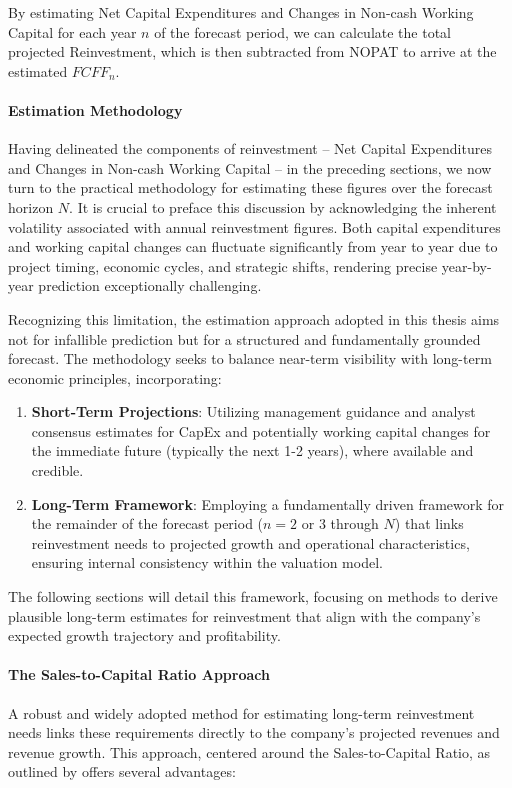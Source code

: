 By estimating Net Capital Expenditures and Changes in Non-cash Working Capital for each year \(n\) of the forecast period, we can calculate the total projected Reinvestment, which is then subtracted from NOPAT to arrive at the estimated \(FCFF_n\).

\paragraph{Estimation Methodology} \label{par:reinvestment_estimation_method}
Having delineated the components of reinvestment – Net Capital Expenditures and Changes in Non-cash Working Capital – in the preceding sections, we now turn to the practical methodology for estimating these figures over the forecast horizon \(N\). It is crucial to preface this discussion by acknowledging the inherent volatility associated with annual reinvestment figures. Both capital expenditures and working capital changes can fluctuate significantly from year to year due to project timing, economic cycles, and strategic shifts, rendering precise year-by-year prediction exceptionally challenging.

Recognizing this limitation, the estimation approach adopted in this thesis aims not for infallible prediction but for a structured and fundamentally grounded forecast. The methodology seeks to balance near-term visibility with long-term economic principles, incorporating:
\begin{enumerate}
    \item \textbf{Short-Term Projections}: Utilizing management guidance and analyst consensus estimates for CapEx and potentially working capital changes for the immediate future (typically the next 1-2 years), where available and credible.
    \item \textbf{Long-Term Framework}: Employing a fundamentally driven framework for the remainder of the forecast period (\(n=2 \text{ or } 3\) through \(N\)) that links reinvestment needs to projected growth and operational characteristics, ensuring internal consistency within the valuation model.
\end{enumerate}
The following sections will detail this framework, focusing on methods to derive plausible long-term estimates for reinvestment that align with the company's expected growth trajectory and profitability.

\paragraph{The Sales-to-Capital Ratio Approach} \label{par:sales_to_capital_ratio}
A robust and widely adopted method for estimating long-term reinvestment needs links these requirements directly to the company's projected revenues and revenue growth. This approach, centered around the Sales-to-Capital Ratio, as outlined by \textcite{damodaran2025investment} offers several advantages:

